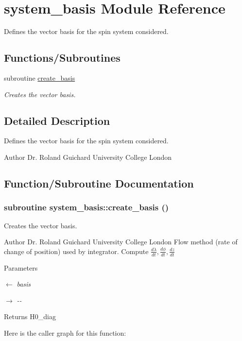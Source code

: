 \hypertarget{namespacesystem__basis}{
\section{system\_\-basis Module Reference}
\label{namespacesystem__basis}
}


Defines the vector basis for the spin system considered.  
\subsection*{Functions/Subroutines}
\begin{DoxyCompactItemize}
\item 
subroutine \hyperlink{namespacesystem__basis_a12b502e29bd15e35c91dd08f836f4e20}{create\_\-basis}
\begin{DoxyCompactList}\small\item\em Creates the vector basis. \item\end{DoxyCompactList}\end{DoxyCompactItemize}


\subsection{Detailed Description}
Defines the vector basis for the spin system considered. \begin{DoxyAuthor}{Author}
Dr. Roland Guichard University College London 
\end{DoxyAuthor}


\subsection{Function/Subroutine Documentation}
\hypertarget{namespacesystem__basis_a12b502e29bd15e35c91dd08f836f4e20}{
\subsubsection[{create\_\-basis}]{\setlength{\rightskip}{0pt plus 5cm}subroutine system\_\-basis::create\_\-basis ()}}
\label{namespacesystem__basis_a12b502e29bd15e35c91dd08f836f4e20}


Creates the vector basis. \begin{DoxyAuthor}{Author}
Dr. Roland Guichard University College London Flow method (rate of change of position) used by integrator. Compute $ \frac{d\lambda}{dt} , \frac{d\phi}{dt}, \frac{dz}{dt} $
\end{DoxyAuthor}

\begin{DoxyParams}{Parameters}
\item[\mbox{$\leftarrow$} {\em basis}]\item[\mbox{$\rightarrow$} {\em -\/-\/}]\end{DoxyParams}
\begin{DoxyReturn}{Returns}
H0\_\-diag 
\end{DoxyReturn}


Here is the caller graph for this function: